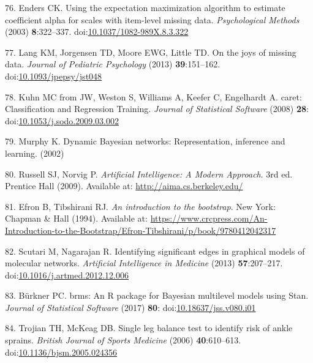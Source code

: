 \documentclass[
  english,
  man]{apa6}
\newenvironment{cslreferences}%
  {}%
  {\par}
\begin{document}
\begin{cslreferences}
\leavevmode\hypertarget{ref-Enders2003}{}%
76. Enders CK. Using the expectation maximization algorithm to estimate coefficient alpha for scales with item-level missing data. \emph{Psychological Methods} (2003) \textbf{8}:322--337. doi:\href{https://doi.org/10.1037/1082-989X.8.3.322}{10.1037/1082-989X.8.3.322}

\leavevmode\hypertarget{ref-Lang2014}{}%
77. Lang KM, Jorgensen TD, Moore EWG, Little TD. On the joys of missing data. \emph{Journal of Pediatric Psychology} (2013) \textbf{39}:151--162. doi:\href{https://doi.org/10.1093/jpepsy/jst048}{10.1093/jpepsy/jst048}

\leavevmode\hypertarget{ref-Kuhn2008}{}%
78. Kuhn MC from JW, Weston S, Williams A, Keefer C, Engelhardt A. caret: Classification and Regression Training. \emph{Journal of Statistical Software} (2008) \textbf{28}: doi:\href{https://doi.org/10.1053/j.sodo.2009.03.002}{10.1053/j.sodo.2009.03.002}

\leavevmode\hypertarget{ref-Murphy2002}{}%
79. Murphy K. Dynamic Bayesian networks: Representation, inference and learning. (2002)

\leavevmode\hypertarget{ref-Norvig2009}{}%
80. Russell SJ, Norvig P. \emph{Artificial Intelligence: A Modern Approach}. 3rd ed. Prentice Hall (2009). Available at: \url{http://aima.cs.berkeley.edu/}

\leavevmode\hypertarget{ref-Efron1993}{}%
81. Efron B, Tibshirani RJ. \emph{An introduction to the bootstrap}. New York: Chapman \& Hall (1994). Available at: \url{https://www.crcpress.com/An-Introduction-to-the-Bootstrap/Efron-Tibshirani/p/book/9780412042317}

\leavevmode\hypertarget{ref-Scutari2013}{}%
82. Scutari M, Nagarajan R. Identifying significant edges in graphical models of molecular networks. \emph{Artificial Intelligence in Medicine} (2013) \textbf{57}:207--217. doi:\href{https://doi.org/10.1016/j.artmed.2012.12.006}{10.1016/j.artmed.2012.12.006}

\leavevmode\hypertarget{ref-Burkner2017a}{}%
83. Bürkner PC. brms: An R package for Bayesian multilevel models using Stan. \emph{Journal of Statistical Software} (2017) \textbf{80}: doi:\href{https://doi.org/10.18637/jss.v080.i01}{10.18637/jss.v080.i01}

\leavevmode\hypertarget{ref-Trojian2006}{}%
84. Trojian TH, McKeag DB. Single leg balance test to identify risk of ankle sprains. \emph{British Journal of Sports Medicine} (2006) \textbf{40}:610--613. doi:\href{https://doi.org/10.1136/bjsm.2005.024356}{10.1136/bjsm.2005.024356}


\end{cslreferences}
\end{document}
